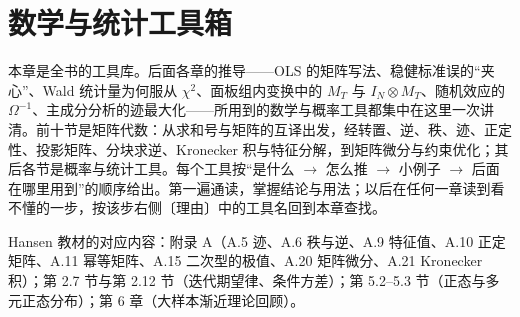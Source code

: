 \chapter{数学与统计工具箱}
\label{ch:U01a-tools}

本章是全书的工具库。后面各章的推导——OLS 的矩阵写法、稳健标准误的“夹心”、Wald 统计量为何服从 $\chi^2$、面板组内变换中的 $M_T$ 与 $I_N\otimes M_T$、随机效应的 $\Omega^{-1}$、主成分分析的迹最大化——所用到的数学与概率工具都集中在这里一次讲清。前十节是矩阵代数：从求和号与矩阵的互译出发，经转置、逆、秩、迹、正定性、投影矩阵、分块求逆、Kronecker 积与特征分解，到矩阵微分与约束优化；其后各节是概率与统计工具。每个工具按“是什么 $\to$ 怎么推 $\to$ 小例子 $\to$ 后面在哪里用到”的顺序给出。第一遍通读，掌握结论与用法；以后在任何一章读到看不懂的一步，按该步右侧〔理由〕中的工具名回到本章查找。

Hansen 教材的对应内容：附录 A（A.5 迹、A.6 秩与逆、A.9 特征值、A.10 正定矩阵、A.11 幂等矩阵、A.15 二次型的极值、A.20 矩阵微分、A.21 Kronecker 积）；第 2.7 节与第 2.12 节（迭代期望律、条件方差）；第 5.2–5.3 节（正态与多元正态分布）；第 6 章（大样本渐近理论回顾）。

